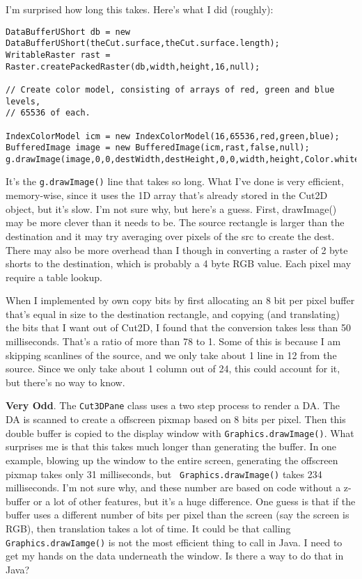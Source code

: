 \documentclass[titlepage,oneside,10pt]{article}
\begin{document}
I'm surprised how long this takes. Here's what I did (roughly):
\footnotesize
\begin{verbatim}
DataBufferUShort db = new DataBufferUShort(theCut.surface,theCut.surface.length);
WritableRaster rast = Raster.createPackedRaster(db,width,height,16,null);

// Create color model, consisting of arrays of red, green and blue levels,
// 65536 of each.

IndexColorModel icm = new IndexColorModel(16,65536,red,green,blue);
BufferedImage image = new BufferedImage(icm,rast,false,null);
g.drawImage(image,0,0,destWidth,destHeight,0,0,width,height,Color.white,null);
\end{verbatim}
\normalsize
It's the {\tt g.drawImage()} line that takes so long. What I've done
is very efficient, memory-wise, since it uses the 1D array that's
already stored in the Cut2D object, but it's slow. I'm not sure why,
but here's a guess. First, drawImage() may be more clever than it
needs to be. The source rectangle is larger than the destination and
it may try averaging over pixels of the src to create the dest. There
may also be more overhead than I though in converting a raster of 2
byte shorts to the destination, which is probably a 4 byte RGB
value. Each pixel may require a table lookup.

When I implemented by own copy bits by first allocating an 8 bit per
pixel buffer that's equal in size to the destination rectangle, and
copying (and translating) the bits that I want out of Cut2D, I
found that the conversion takes less than 50 milliseconds. That's a
ratio of more than 78 to 1. Some of this is because I am skipping
scanlines of the source, and we only take about 1 line in 12 from the
source. Since we only take about 1 column out of 24, this could
account for it, but there's no way to know.

{\bf Very Odd}. The {\tt Cut3DPane} class uses a two step process to
render a DA. The DA is scanned to create a offscreen pixmap
based on 8 bits per pixel. Then this double buffer is copied to the
display window with {\tt Graphics.drawImage()}. What surprises me is
that this takes much longer than generating the buffer. In one
example, blowing up the window to the entire screen, generating the
offscreen pixmap takes only 31 milliseconds, but {\tt
  Graphics.drawImage()} takes 234 milliseconds. I'm not sure why, and
these number are based on code without a z-buffer or a lot of other
features, but it's a huge difference. One guess is that if the buffer uses
a different number of bits per pixel than the screen (say the screen
is RGB), then translation takes a lot of time. It could be that
calling {\tt Graphics.drawIamge()} is not the most efficient thing to
call in Java. I need to get my hands on the data underneath the
window. Is there a way to do that in Java?
\end{document}

